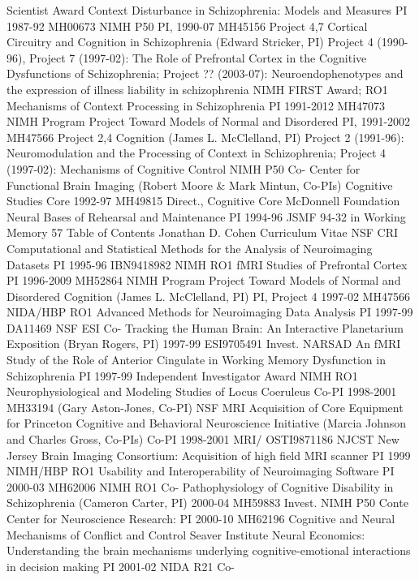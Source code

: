 \documentclass[10 pt]{article}
\begin{document}
 Scientist Award Context Disturbance in Schizophrenia: Models and Measures
PI 1987-92 MH00673
NIMH P50 PI,
1990-07 MH45156
Project 4,7
Cortical Circuitry and Cognition in Schizophrenia (Edward Stricker, PI) Project 4 (1990-96), Project 7 (1997-02): The Role of Prefrontal Cortex in the Cognitive Dysfunctions of Schizophrenia; Project ?? (2003-07): Neuroendophenotypes and the expression of illness liability in schizophrenia
NIMH FIRST
Award; RO1 Mechanisms of Context Processing in Schizophrenia
PI 1991-2012 MH47073
NIMH Program Project
Toward Models of Normal and Disordered
PI,
1991-2002 MH47566
Project 2,4
Cognition (James L. McClelland, PI) Project 2 (1991-96): Neuromodulation and the Processing of Context in Schizophrenia; Project 4 (1997-02): Mechanisms of Cognitive Control
NIMH P50 Co-
Center for Functional Brain Imaging (Robert Moore & Mark Mintun, Co-PIs) Cognitive Studies Core
1992-97 MH49815
Direct.,
Cognitive Core
McDonnell
Foundation
Neural Bases of Rehearsal and Maintenance
PI 1994-96 JSMF 94-32
in Working Memory
57 Table of Contents
Jonathan D. Cohen Curriculum Vitae
NSF CRI Computational and Statistical Methods for the Analysis of Neuroimaging Datasets
PI 1995-96 IBN9418982
NIMH RO1 fMRI Studies of Prefrontal Cortex PI 1996-2009 MH52864
NIMH Program Project
Toward Models of Normal and Disordered
Cognition (James L. McClelland, PI)
PI,
Project 4
1997-02 MH47566
NIDA/HBP RO1 Advanced Methods for Neuroimaging Data Analysis
PI 1997-99 DA11469
NSF ESI Co-
Tracking the Human Brain: An Interactive Planetarium Exposition (Bryan Rogers, PI)
1997-99 ESI9705491
Invest.
NARSAD
An fMRI Study of the Role of Anterior Cingulate in Working Memory Dysfunction in Schizophrenia
PI 1997-99
Independent Investigator Award
NIMH RO1 Neurophysiological and Modeling Studies of Locus Coeruleus
Co-PI 1998-2001 MH33194
(Gary Aston-Jones, Co-PI)
NSF MRI Acquisition of Core Equipment for Princeton Cognitive and Behavioral Neuroscience Initiative (Marcia Johnson and Charles Gross, Co-PIs)
Co-PI 1998-2001 MRI/
OSTI9871186
NJCST New Jersey Brain Imaging Consortium: Acquisition of high field MRI scanner
PI 1999
NIMH/HBP RO1 Usability and Interoperability of Neuroimaging Software
PI 2000-03 MH62006
NIMH RO1 Co-
Pathophysiology of Cognitive Disability in Schizophrenia (Cameron Carter, PI)
2000-04 MH59883
Invest.
NIMH P50 Conte Center for Neuroscience Research:
PI 2000-10 MH62196
Cognitive and Neural Mechanisms of Conflict and Control
Seaver Institute Neural Economics: Understanding the brain mechanisms underlying cognitive-emotional interactions in decision making
PI 2001-02
NIDA R21 Co-
\end{document}
